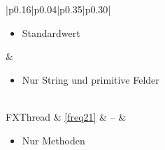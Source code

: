 \begin{longtable}[H]{|p{0.16\textwidth}|p{0.04\textwidth}|p{0.35\textwidth}|p{0.30\textwidth}|}
\begin{minipage}[t]{\linewidth}
\begin{itemize}[nosep,after=\strut,leftmargin=*]
				\item Standardwert
			\end{itemize}
		\end{minipage} & 
		\begin{minipage}[t]{\linewidth}
			\begin{itemize}[nosep,after=\strut,leftmargin=*]
				\item Nur String und primitive Felder
			\end{itemize}
		\end{minipage} \\
		\hline
		FXThread & \ref{freq21} & -- & 
		\begin{minipage}[t]{\linewidth}
			\begin{itemize}[nosep,after=\strut,leftmargin=*]
				\item Nur Methoden
			\end{itemize}
		\end{minipage} \\
		\hline
\end{longtable}